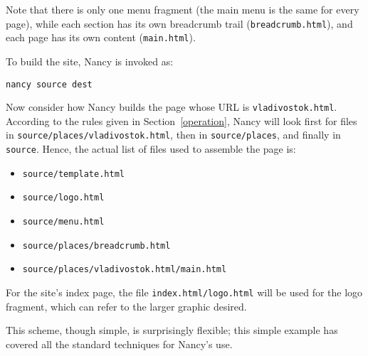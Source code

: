 \documentclass[english]{scrartcl}
\begin{document}
Note that there is only one menu fragment (the main menu is the same for every page), while each section has its own breadcrumb trail (\verb|breadcrumb.html|), and each page has its own content (\verb|main.html|).

To build the site, Nancy is invoked as:

\begin{verbatim}
nancy source dest
\end{verbatim}

Now consider how Nancy builds the page whose URL is \verb|vladivostok.html|. According to the rules given in Section~\ref{operation}, Nancy will look first for files in \verb|source/places/vladivostok.html|, then in \verb|source/places|, and finally in \verb|source|. Hence, the actual list of files used to assemble the page is:

\begin{itemize}
\item \verb|source/template.html|
\item \verb|source/logo.html|
\item \verb|source/menu.html|
\item \verb|source/places/breadcrumb.html|
\item \verb|source/places/vladivostok.html/main.html|
\end{itemize}

For the site’s index page, the file \verb|index.html/logo.html| will be used for the logo fragment, which can refer to the larger graphic desired.

This scheme, though simple, is surprisingly flexible; this simple example has covered all the standard techniques for Nancy’s use.
\end{document}
